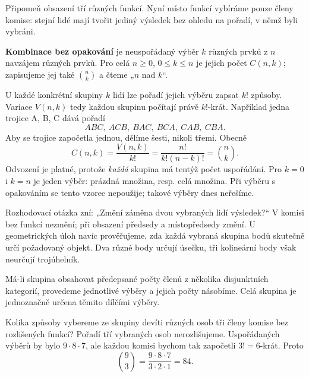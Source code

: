 \documentclass[11pt,a4paper]{article}
\begin{document}
Připomeň obsazení tří různých funkcí. Nyní místo funkcí vybíráme pouze členy komise: stejní lidé mají tvořit jediný výsledek bez ohledu na pořadí, v němž byli vybráni.

\begin{definiceBox}
\textbf{Kombinace bez opakování} je neuspořádaný výběr $k$ různých prvků z $n$ navzájem různých prvků. Pro celá $n\geq0$, $0\leq k\leq n$ je jejich počet $C(n,k)$; zapisujeme jej také $\binom nk$ a čteme „$n$ nad $k$“.
\end{definiceBox}

U každé konkrétní skupiny $k$ lidí lze pořadí jejich výběru zapsat $k!$ způsoby. Variace $V(n,k)$ tedy každou skupinu počítají právě $k!$-krát. Například jedna trojice A, B, C dává pořadí
\[
 ABC,\ ACB,\ BAC,\ BCA,\ CAB,\ CBA.
\]
Aby se trojice započetla jednou, dělíme šesti, nikoli třemi. Obecně
\[
 C(n,k)=\frac{V(n,k)}{k!}=\frac{n!}{k!(n-k)!}=\binom nk.
\]
Odvození je platné, protože \emph{každá} skupina má tentýž počet uspořádání. Pro $k=0$ i $k=n$ je jeden výběr: prázdná množina, resp. celá množina. Při výběru s opakováním se tento vzorec nepoužije; takové výběry dnes neřešíme.

Rozhodovací otázka zní: „Změní záměna dvou vybraných lidí výsledek?“ V komisi bez funkcí nezmění; při obsazení předsedy a místopředsedy změní. U geometrických úloh navíc prověřujeme, zda každá vybraná skupina bodů skutečně určí požadovaný objekt. Dva různé body určují úsečku, tři kolineární body však neurčují trojúhelník.

Má-li skupina obsahovat předepsané počty členů z několika disjunktních kategorií, provedeme jednotlivé výběry a jejich počty násobíme. Celá skupina je jednoznačně určena těmito dílčími výběry.




\begin{prikladReseniBox}[title={Příklad P1}]
Kolika způsoby vybereme ze skupiny devíti různých osob tři členy komise bez rozlišených funkcí?
\tcblower
Pořadí tří vybraných osob nerozlišujeme. Uspořádaných výběrů by bylo $9\cdot8\cdot7$, ale každou komisi bychom tak započetli $3!=6$-krát. Proto
\[
\binom93=\frac{9\cdot8\cdot7}{3\cdot2\cdot1}=84.
\]
\end{prikladReseniBox}
\end{document}

